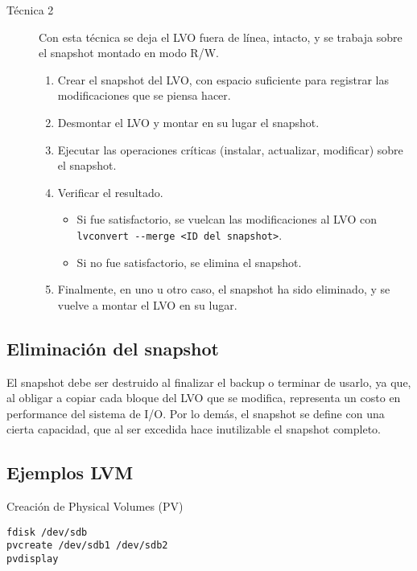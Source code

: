 \begin{description}
\item [Técnica 2] Con esta técnica se deja el LVO fuera de línea, intacto, y se trabaja sobre el snapshot montado en modo R/W. 
\begin{enumerate}
	\item Crear el snapshot del LVO, con espacio suficiente para registrar las modificaciones que se piensa hacer.
	\item Desmontar el LVO y montar en su lugar el snapshot.
	\item Ejecutar las operaciones críticas (instalar, actualizar, modificar) sobre el snapshot.
	\item Verificar el resultado.
	\begin{itemize}
		\item Si fue satisfactorio, se vuelcan las modificaciones al LVO con  \lstinline$lvconvert --merge <ID del snapshot>$. 
		\item Si no fue satisfactorio, se elimina el snapshot.
	\end{itemize}
	\item Finalmente, en uno u otro caso, el snapshot ha sido eliminado, y se vuelve a montar el LVO en su lugar.
\end{enumerate}
\end{description}



\subsection{Eliminación del snapshot}
\label{ssub:snapdel}

El snapshot debe ser destruido al finalizar el backup o terminar de usarlo, ya que, al obligar a  copiar  cada bloque del LVO que se modifica, representa un  costo en performance del sistema de I/O. Por lo demás, el snapshot se define con una cierta capacidad, que al ser excedida hace inutilizable el snapshot completo.


\subsection{Ejemplos LVM}
\label{sub:ejemplosLVM}

Creación de Physical Volumes (PV)
\begin{lstlisting}
fdisk /dev/sdb
pvcreate /dev/sdb1 /dev/sdb2
pvdisplay
\end{lstlisting}

